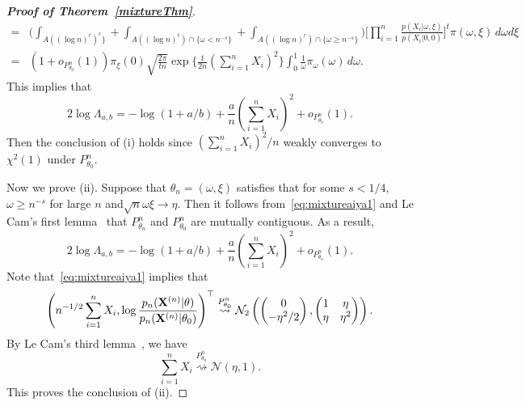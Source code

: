 \documentclass[11pt]{article}
\theoremstyle{plain}
\theoremstyle{definition}
\theoremstyle{remark}
\begin{document}
\begin{appendices}
\begin{proof}[\textbf{Proof of Theorem~\ref{mixtureThm}}]
\begin{align*}
=& \bigg( \int_{A( (\log n)^r )^c\}}+\int_{A( (\log n)^r )\cap \{\omega< n^{-s}\}}+\int_{A( (\log n)^r )\cap \{\omega\geq n^{-s}\}}\bigg) \Big[\prod_{i=1}^n \frac{p(X_i|\omega,\xi)}{p(X_i|0,0)}\Big]^t \pi(\omega,\xi)\, d\omega d\xi
    \\
    =&
    (1+o_{P^n_{\theta_0}}(1))\pi_{\xi}(0)\sqrt{\frac{2\pi}{tn}}\exp \Big\{ \frac{t}{2n}(\sum_{i=1}^n X_i)^2\Big\} 
\int_{0}^1 
\frac{1}{\omega}
\pi_{\omega}(\omega)\, d\omega.
\end{align*}
This implies that
\begin{equation*}
    2\log \Lambda_{a,b}=-\log(1+a/b)+\frac{a}{n}(\sum_{i=1}^n X_i)^2+o_{P^n_{\theta_0}}(1).
\end{equation*}
Then the conclusion of (i) holds since $(\sum_{i=1}^n X_i)^2/n$ weakly converges to $ \chi^2(1)$ under $P^n_{\theta_0}$.

Now we prove (ii). Suppose that $\theta_n=(\omega,\xi)$ satisfies that for some $s<1/4$, $\omega\geq n^{-s}$ for large $n$ and$\sqrt{n}\omega \xi \to \eta$.
Then it follows from~\eqref{eq:mixtureaiya1} and Le Cam's first lemma~\citep[Theorem 6.4]{van2000asymptotic} that
$P^n_{\theta_n}$ and $P^n_{\theta_0}$ are mutually contiguous.
As a result,
\begin{equation*}
    2\log \Lambda_{a,b}=-\log(1+a/b)+\frac{a}{n}(\sum_{i=1}^n X_i)^2+o_{P^n_{\theta_n}}(1).
\end{equation*}
Note that~\eqref{eq:mixtureaiya1} implies that
\begin{equation*}
        \left(n^{-1/2}\sum_{i=1}^n X_i,\log \frac{p_n(\mathbf{X}^{(n)}|\theta)}{p_n(\mathbf{X}^{(n)}|\theta_0)}\right)^\top 
        \overset{P^n_{\theta_0}}{\rightsquigarrow}
        \mathcal{N}_2\left(
    \begin{pmatrix}
        0\\
        -{\eta^2}/{2}
    \end{pmatrix}
    ,
    \begin{pmatrix}
        1 & \eta\\
        \eta & \eta^2
    \end{pmatrix}
\right).
\end{equation*}
By Le Cam's third lemma~\citep[Example 6.7]{van2000asymptotic}, we have
\begin{equation*}
    \sum_{i=1}^n X_i
    \overset{P^n_{\theta_n}}{\rightsquigarrow} \mathcal{N}(\eta,1).
\end{equation*}
This proves the conclusion of (ii).

\end{proof}

\end{appendices}
\end{document}
